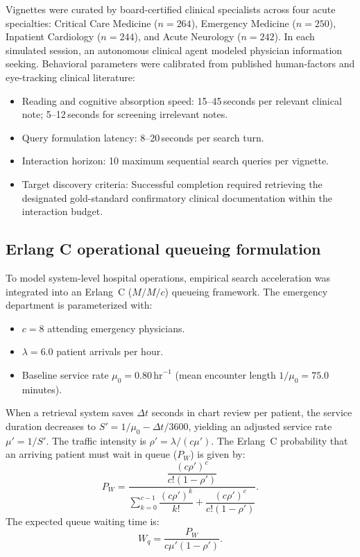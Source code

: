 \documentclass[12pt]{article}
\begin{document}
Vignettes were curated by board-certified clinical specialists across four acute specialties: Critical Care Medicine ($n=264$), Emergency Medicine ($n=250$), Inpatient Cardiology ($n=244$), and Acute Neurology ($n=242$). In each simulated session, an autonomous clinical agent modeled physician information seeking. Behavioral parameters were calibrated from published human-factors and eye-tracking clinical literature\cite{sinsky2016allocation,zheng2021analyzing,harry2018cognitive}:
\begin{itemize}
  \item Reading and cognitive absorption speed: 15--45\,seconds per relevant clinical note; 5--12\,seconds for screening irrelevant notes.
  \item Query formulation latency: 8--20\,seconds per search turn.
  \item Interaction horizon: 10 maximum sequential search queries per vignette.
  \item Target discovery criteria: Successful completion required retrieving the designated gold-standard confirmatory clinical documentation within the interaction budget.
\end{itemize}

\subsection*{Erlang C operational queueing formulation}

To model system-level hospital operations, empirical search acceleration was integrated into an Erlang~C ($M/M/c$) queueing framework\cite{erlang1917solution,kleinrock1975queueing}. The emergency department is parameterized with:
\begin{itemize}
  \item $c = 8$ attending emergency physicians.
  \item $\lambda = 6.0$ patient arrivals per hour.
  \item Baseline service rate $\mu_0 = 0.80\,\text{hr}^{-1}$ (mean encounter length $1/\mu_0 = 75.0$\,minutes).
\end{itemize}
When a retrieval system saves $\Delta t$ seconds in chart review per patient, the service duration decreases to $S' = 1/\mu_0 - \Delta t/3600$, yielding an adjusted service rate $\mu' = 1/S'$. The traffic intensity is $\rho' = \lambda / (c \mu')$. The Erlang~C probability that an arriving patient must wait in queue ($P_W$) is given by:
\begin{equation}
  P_W = \frac{\dfrac{(c\rho')^c}{c!(1-\rho')}}{\sum_{k=0}^{c-1}\dfrac{(c\rho')^k}{k!} + \dfrac{(c\rho')^c}{c!(1-\rho')}}.
\end{equation}
The expected queue waiting time is:
\begin{equation}
  W_q = \frac{P_W}{c\mu'(1-\rho')}.
\end{equation}
\end{document}
